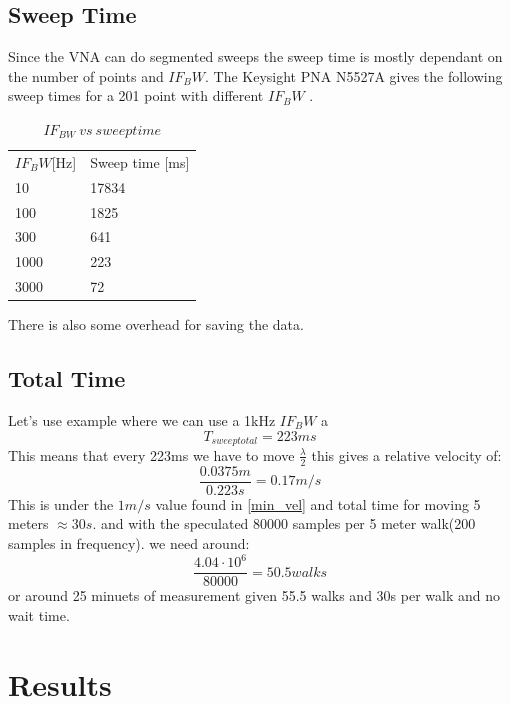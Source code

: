 \subsection{Sweep Time}
Since the \gls{VNA} can do segmented sweeps the sweep time is mostly dependant on the number of points and $IF_BW$.
The Keysight PNA N5527A gives the following sweep times for a 201 point with different $IF_BW$ \citep{Key_PNA}.

\begin{table}[h]
\centering
\caption{$IF_{BW} \ vs \ sweep time$}
\label{my-label}
\begin{tabular}{l|l}
\hline
$IF_BW${[}Hz{]} & Sweep time {[}ms{]} \\
10              & 17834               \\
100             & 1825                \\
300             & 641                 \\
1000            & 223                 \\
3000            & 72                 
\end{tabular}
\end{table}


There is also some overhead for saving the data.
\subsection{Total Time}
Let's use example where we can use a 1kHz $IF_BW$ a
\begin{equation}
T_{sweep total} = 223ms
\end{equation}
This means that every 223ms we have to move $\frac{\lambda}{2}$ this gives a relative velocity of:
\begin{equation}
\frac{0.0375m}{0.223s} = 0.17 m/s
\end{equation}
This is under the $1m/s$ value found in \autoref{min_vel}
and total time for moving 5 meters $\approx 30s$.
and with the speculated 80000 samples per 5 meter walk(200 samples in frequency). we need around:
\begin{equation}
\frac{4.04 \cdot 10^6}{80000} = 50.5 walks
\end{equation}
or around 25 minuets of measurement given 55.5 walks and 30s per walk and no wait time.

\section{Results}